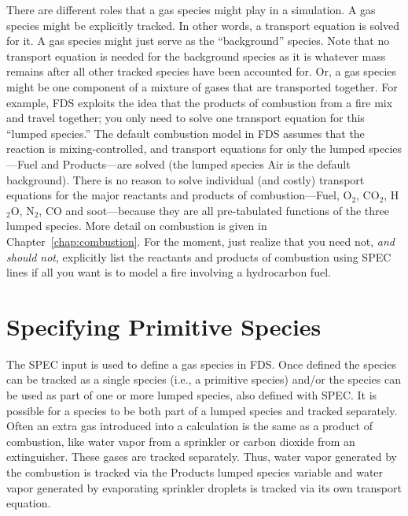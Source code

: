 \documentclass[11pt]{book}
\begin{document}
There are different roles that a gas species might play in a simulation. A gas species might be explicitly tracked. In other words, a transport equation is solved for it. A gas species might just serve as the ``background'' species.  Note that no transport equation is needed for the background species as it is whatever mass remains after all other tracked species have been accounted for. Or, a gas species might be one component of a mixture of gases that are transported together. For example, FDS exploits the idea that the products of combustion from a fire mix and travel together; you only need to solve one transport equation for this ``lumped species.'' The default combustion model in FDS assumes that the reaction is mixing-controlled, and transport equations for only the lumped species---Fuel and Products---are solved (the lumped species Air is the default background).  There is no reason to solve individual (and costly) transport equations for the major reactants and products of combustion---Fuel, O$_2$, CO$_2$, H$_2$O, N$_2$, CO and soot---because they are all pre-tabulated functions of the three lumped species. More detail on combustion is given in Chapter~\ref{chap:combustion}. For the moment, just realize that you need not, {\em and should not}, explicitly list the reactants and products of combustion using {\ct SPEC} lines if all you want is to model a fire involving a hydrocarbon fuel.



\section{Specifying Primitive Species}
\label{info:primitive}

The {\ct SPEC} input is used to define a gas species in FDS. Once defined the species can be tracked as a single species (i.e., a primitive species) and/or the species can be used as part of one or more lumped species, also defined with {\ct SPEC}.  It is possible for a species to be both part of a lumped species and tracked separately. Often an extra gas introduced into a calculation is the same as a product of combustion, like water vapor from a sprinkler or carbon dioxide from an extinguisher. These gases are tracked separately. Thus, water vapor generated by the combustion is tracked via the Products lumped species variable and water vapor generated by evaporating sprinkler droplets is tracked via its own transport equation.
\end{document}
